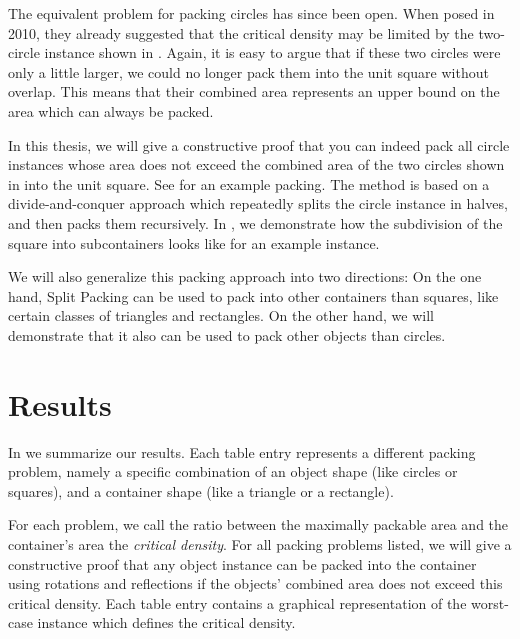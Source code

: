 \documentclass[a4paper,style=print,bibliography=totoc,nexus,lnum,extramargin]{tubsbook}
\begin{document}

The equivalent problem for packing circles has since been open.
When \textcite{DFL2010circle} posed  in 2010, they already suggested that the critical density may be limited by the two-circle instance shown in . Again, it is easy to argue that if these two circles were only a little larger, we could no longer pack them into the unit square without overlap. This means that their combined area represents an upper bound on the area which can always be packed.


In this thesis, we will give a constructive proof that you can indeed pack all circle instances whose area does not exceed the combined area of the two circles shown in  into the unit square. See  for an example packing.
The method is based on a divide-and-conquer approach which repeatedly splits the circle instance in halves, and then packs them recursively. In , we demonstrate how the subdivision of the square into subcontainers looks like for an example instance.

We will also generalize this packing approach into two directions: On the one hand, Split Packing can be used to pack into other containers than squares, like certain classes of triangles and rectangles. On the other hand, we will demonstrate that it also can be used to pack other objects than circles.


\section{Results}

In  we summarize our results. Each table entry represents a different packing problem, namely a specific combination of an object shape (like circles or squares), and a container shape (like a triangle or a rectangle).

For each problem, we call the ratio between the maximally packable area and the container's area the \emph{critical density}.
For all packing problems listed, we will give a constructive proof that any object instance can be packed into the container using rotations and reflections if the objects' combined area does not exceed this critical density. Each table entry contains a graphical representation of the worst-case instance which defines the critical density.
\end{document}
